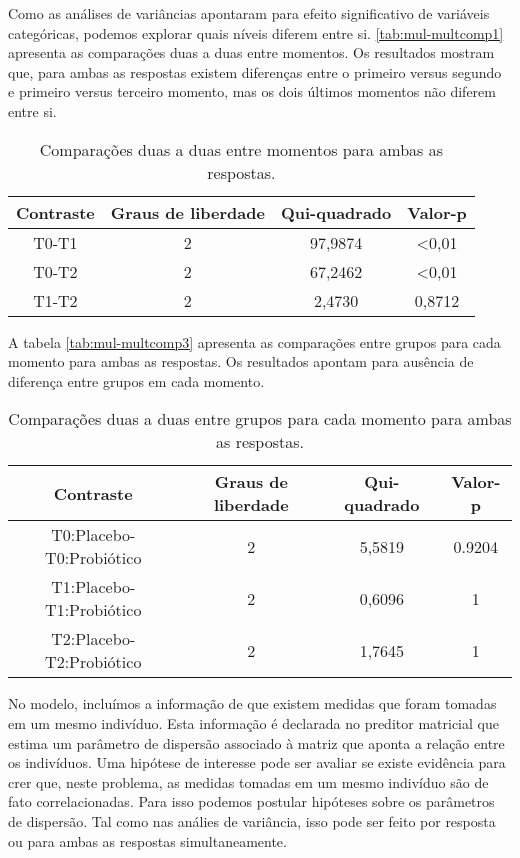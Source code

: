 Como as análises de variâncias apontaram para efeito significativo de variáveis categóricas, podemos explorar quais níveis diferem entre si. \autoref{tab:mul-multcomp1} apresenta as comparações duas a duas entre momentos. Os resultados mostram que, para ambas as respostas existem diferenças entre o primeiro versus segundo e primeiro versus terceiro momento, mas os dois últimos momentos não diferem entre si.

\begin{table}[H]
\centering
\begin{tabular}{cccc}
\hline
Contraste & Graus de liberdade & Qui-quadrado & Valor-p        \\ \hline
T0-T1     & 2                  & 97,9874      & \textless 0,01 \\
T0-T2     & 2                  & 67,2462      & \textless 0,01 \\
T1-T2     & 2                  & 2,4730       & 0,8712         \\ \hline
\end{tabular}
\caption{Comparações duas a duas entre momentos para ambas as respostas.}
\label{tab:mul-multcomp1}
\end{table}

A tabela \autoref{tab:mul-multcomp3} apresenta as comparações entre grupos para cada momento para ambas as respostas. Os resultados apontam para ausência de diferença entre grupos em cada momento.

\begin{table}[H]
\centering
\begin{tabular}{cccc}
\hline
Contraste                & Graus de liberdade & Qui-quadrado & Valor-p \\ \hline
T0:Placebo-T0:Probiótico & 2                  & 5,5819       & 0.9204  \\
T1:Placebo-T1:Probiótico & 2                  & 0,6096       & 1       \\
T2:Placebo-T2:Probiótico & 2                  & 1,7645       & 1       \\ \hline
\end{tabular}
\caption{Comparações duas a duas entre grupos para cada momento para ambas as respostas.}
\label{tab:mul-multcomp3}
\end{table}

No modelo, incluímos a informação de que existem medidas que foram tomadas em um mesmo indivíduo. Esta informação é declarada no preditor matricial que estima um parâmetro de dispersão associado à matriz que aponta a relação entre os indivíduos. Uma hipótese de interesse pode ser avaliar se existe evidência para crer que, neste problema, as medidas tomadas em um mesmo indivíduo são de fato correlacionadas. Para isso podemos postular hipóteses sobre os parâmetros de dispersão. Tal como nas análies de variância, isso pode ser feito por resposta ou para ambas as respostas simultaneamente.

